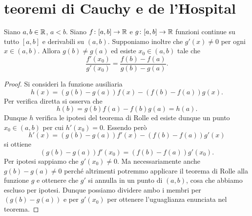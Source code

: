 \section{teoremi di Cauchy e de l'Hospital}

\begin{theorem}[Cauchy]
\label{th:cauchy}%
\mymark{**}%
%
%
%
Siano $a,b\in {\mathbb R}$, $a < b$.
%
Siano $f\colon[a,b]\to {\mathbb R}$ e $g\colon[a,b]\to {\mathbb R}$ funzioni continue su tutto $[a,b]$ e derivabili su $(a,b)$.
Supponiamo inoltre che $g'(x)\neq 0$ per ogni $x\in (a,b)$.
Allora $g(b) \neq g(a)$ ed esiste $x_0\in(a,b)$ tale che
\[
  \frac{f'(x_0)}{g'(x_0)} = \frac{f(b)-f(a)}{g(b)-g(a)}.
\]
\end{theorem}
%
\begin{proof}
\mymark{**}
Si consideri la funzione ausiliaria
\[
 h(x) = (g(b)-g(a))f(x) - (f(b)-f(a))g(x).
\]
Per verifica diretta si osserva che
\[
  h(b) = g(b)f(a) - f(b)g(a) = h(a).
\]
Dunque $h$ verifica le ipotesi del teorema di Rolle ed esiste
dunque un punto $x_0\in(a,b)$ per cui $h'(x_0) = 0$.
Essendo però
\[
  h'(x) = (g(b) - g(a)) f'(x) - (f(b)-f(a)) g'(x)
\]
si ottiene
\[
 (g(b)-g(a))f'(x_0) = (f(b) - f(a))g'(x_0).
\]
Per ipotesi sappiamo che $g'(x_0)\neq 0$.
Ma necessariamente anche $g(b) - g(a)\neq 0$ perché altrimenti potremmo applicare il teorema di Rolle alla funzione $g$ e ottenere che $g'$ si annulla in un punto di $(a,b)$, cosa che abbiamo escluso per ipotesi.
Dunque possiamo dividere ambo i membri per $(g(b)-g(a))$ e per $g'(x_0)$ per ottenere l'uguaglianza enunciata nel teorema.
\end{proof}

